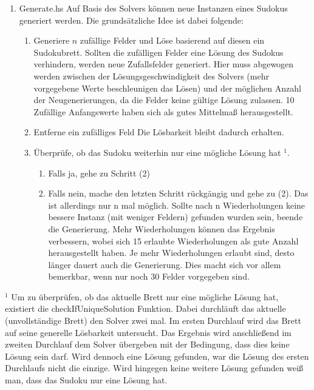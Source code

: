 \begin{enumerate}[(1)]
    \item Generate.hs \newline
    Auf Basis des Solvers können neue Instanzen eines Sudokus generiert werden. Die grundsätzliche Idee ist dabei folgende:
        \begin{enumerate}[(1)]
            \item Generiere \(n\) zufällige Felder und Löse basierend auf diesen ein Sudokubrett. \newline
            Sollten die zufälligen Felder eine Lösung des Sudokus verhindern, werden neue Zufallsfelder generiert. Hier muss abgewogen werden zwischen der Lösungsgeschwindigkeit des Solvers (mehr vorgegebene Werte beschleunigen das Lösen) und der möglichen Anzahl der Neugenerierungen, da die Felder keine gültige Lösung zulassen. 10 Zufällige Anfangswerte haben sich als gutes Mittelmaß herausgestellt.
            \item Entferne ein zufälliges Feld \newline
            Die Lösbarkeit bleibt dadurch erhalten.
            \item Überprüfe, ob das Sudoku weiterhin nur eine mögliche Lösung hat $^1$.
            \begin{enumerate}
                \item Falls ja, gehe zu Schritt (2)
                \item Falls nein, mache den letzten Schritt rückgängig und gehe zu (2). \newline
                Das ist allerdings nur n mal möglich. Sollte nach n Wiederholungen keine bessere Instanz (mit weniger Feldern) gefunden wurden sein, beende die Generierung. Mehr Wiederholungen können das Ergebnis verbessern, wobei sich 15 erlaubte Wiederholungen als gute Anzahl herausgestellt haben. Je mehr Wiederholungen erlaubt sind, desto länger dauert auch die Generierung. Dies macht sich vor allem bemerkbar, wenn nur noch 30 Felder vorgegeben sind.
            \end{enumerate}
        \end{enumerate}
\end{enumerate}
$^1$ Um zu überprüfen, ob das aktuelle Brett nur eine mögliche Lösung hat, existiert die checkIfUniqueSolution Funktion. Dabei durchläuft das aktuelle (unvollständige Brett) den Solver zwei mal. Im ersten Durchlauf wird das Brett auf seine generelle Lösbarkeit untersucht. Das Ergebnis wird anschließend im zweiten Durchlauf dem Solver übergeben mit der Bedingung, dass dies keine Lösung sein darf. Wird dennoch eine Lösung gefunden, war die Lösung des ersten Durchlaufs nicht die einzige. Wird hingegen keine weitere Lösung gefunden weiß man, dass das Sudoku nur eine Lösung hat.

